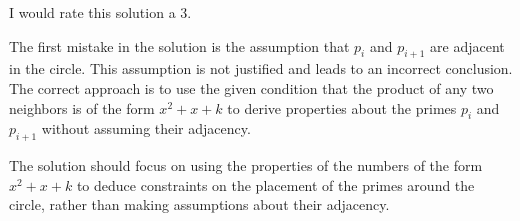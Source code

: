 I would rate this solution a 3.

The first mistake in the solution is the assumption that $p_i$ and $p_{i+1}$ are adjacent in the circle. This assumption is not justified and leads to an incorrect conclusion. The correct approach is to use the given condition that the product of any two neighbors is of the form $x^2 + x + k$ to derive properties about the primes $p_i$ and $p_{i+1}$ without assuming their adjacency.

The solution should focus on using the properties of the numbers of the form $x^2 + x + k$ to deduce constraints on the placement of the primes around the circle, rather than making assumptions about their adjacency.
